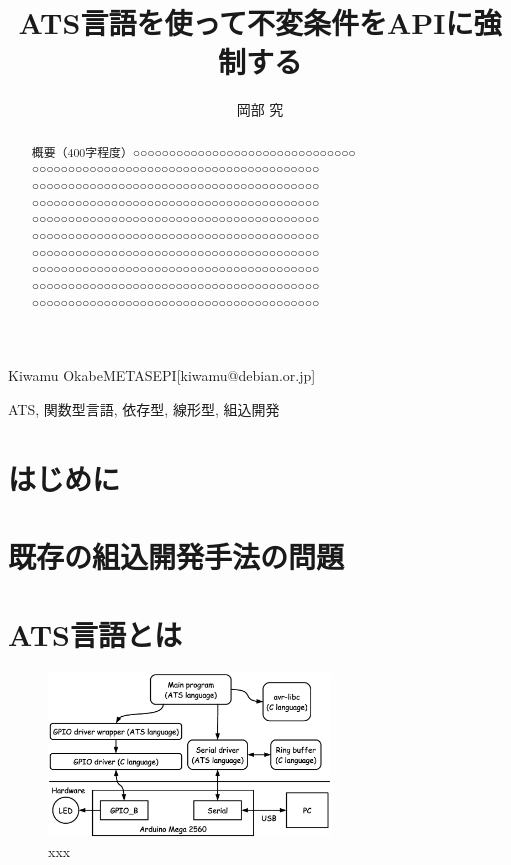 \documentclass{ipsjprosym}
\begin{document}
\title{ATS言語を使って不変条件をAPIに強制する}


\author{岡部 究}{Kiwamu Okabe}{METASEPI}[kiwamu@debian.or.jp]

\begin{abstract}
概要（400字程度）○○○○○○○○○○○○○○○○○○○○○○○○○○○○○○○
○○○○○○○○○○○○○○○○○○○○○○○○○○○○○○○○○○○○○○○○
○○○○○○○○○○○○○○○○○○○○○○○○○○○○○○○○○○○○○○○○
○○○○○○○○○○○○○○○○○○○○○○○○○○○○○○○○○○○○○○○○
○○○○○○○○○○○○○○○○○○○○○○○○○○○○○○○○○○○○○○○○
○○○○○○○○○○○○○○○○○○○○○○○○○○○○○○○○○○○○○○○○
○○○○○○○○○○○○○○○○○○○○○○○○○○○○○○○○○○○○○○○○
○○○○○○○○○○○○○○○○○○○○○○○○○○○○○○○○○○○○○○○○
○○○○○○○○○○○○○○○○○○○○○○○○○○○○○○○○○○○○○○○○
○○○○○○○○○○○○○○○○○○○○○○○○○○○○○○○○○○○○○○○○
\end{abstract}

\begin{jkeyword}
ATS, 関数型言語, 依存型, 線形型, 組込開発
\end{jkeyword}

\maketitle

\section{はじめに}
\section{既存の組込開発手法の問題}
\section{ATS言語とは}

\begin{figure}[h]
\centering
\includegraphics[width=75mm]{draw/demo_ats_arduino.eps}
\caption{xxx}
\label{fig:demo_ats_arduino}
\end{figure}
\end{document}
